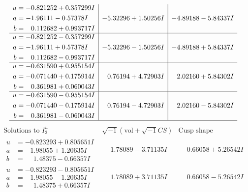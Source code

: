 \documentclass[1p]{elsarticle_modified}
\theoremstyle{definition}
\newcommand{\I}{\sqrt{-1}}
\begin{document}
$$\begin{array}{c|c|c}
\begin{aligned}
u &= -0.821252 + 0.357299 I \\
a &= -1.96111 - 0.57378 I \\
b &= \phantom{-}0.112682 + 0.993717 I\end{aligned}
 & -5.32296 + 1.50256 I & -4.89188 - 5.84337 I \\ \hline\begin{aligned}
u &= -0.821252 - 0.357299 I \\
a &= -1.96111 + 0.57378 I \\
b &= \phantom{-}0.112682 - 0.993717 I\end{aligned}
 & -5.32296 - 1.50256 I & -4.89188 + 5.84337 I \\ \hline\begin{aligned}
u &= -0.631590 + 0.955154 I \\
a &= -0.071440 + 0.175914 I \\
b &= \phantom{-}0.361981 + 0.060043 I\end{aligned}
 & \phantom{-}0.76194 + 4.72903 I & \phantom{-}2.02160 + 5.84302 I \\ \hline\begin{aligned}
u &= -0.631590 - 0.955154 I \\
a &= -0.071440 - 0.175914 I \\
b &= \phantom{-}0.361981 - 0.060043 I\end{aligned}
 & \phantom{-}0.76194 - 4.72903 I & \phantom{-}2.02160 - 5.84302 I\\
 \hline 
 \end{array}$$\newpage$$\begin{array}{c|c|c}  
\text{Solutions to }I^u_{2}& \I (\text{vol} + \sqrt{-1}CS) & \text{Cusp shape}\\
 \hline 
\begin{aligned}
u &= -0.823293 + 0.805651 I \\
a &= -1.98055 + 1.20635 I \\
b &= \phantom{-}1.48375 - 0.66357 I\end{aligned}
 & \phantom{-}1.78089 - 3.71135 I & \phantom{-}0.66058 + 5.26542 I \\ \hline\begin{aligned}
u &= -0.823293 - 0.805651 I \\
a &= -1.98055 - 1.20635 I \\
b &= \phantom{-}1.48375 + 0.66357 I\end{aligned}
 & \phantom{-}1.78089 + 3.71135 I & \phantom{-}0.66058 - 5.26542 I \\ \hline\begin{aligned}

\end{aligned}
\end{array}$$
\end{document}
